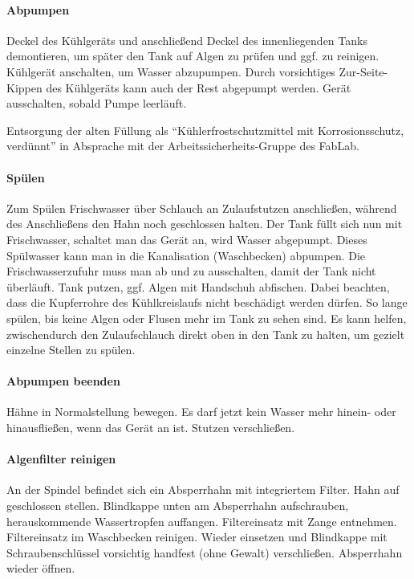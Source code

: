 \documentclass{\basedir/fablab-document}
\begin{document}
\paragraph{Abpumpen} Deckel des Kühlgeräts und anschließend Deckel des innenliegenden Tanks demontieren, um später den Tank auf Algen zu prüfen und ggf. zu reinigen. Kühlgerät anschalten, um Wasser abzupumpen. Durch vorsichtiges Zur-Seite-Kippen des Kühlgeräts kann auch der Rest abgepumpt werden. Gerät ausschalten, sobald Pumpe leerläuft.

Entsorgung der alten Füllung als \enquote{Kühlerfrostschutzmittel mit Korrosionsschutz, verdünnt} in Absprache mit der Arbeitssicherheits-Gruppe des FabLab.

\paragraph{Spülen} Zum Spülen Frischwasser über Schlauch an Zulaufstutzen anschließen, während des Anschließens den Hahn noch geschlossen halten. Der Tank füllt sich nun mit Frischwasser, schaltet man das Gerät an, wird Wasser abgepumpt. Dieses Spülwasser kann man in die Kanalisation (Waschbecken) abpumpen. Die Frischwasserzufuhr muss man ab und zu ausschalten, damit der Tank nicht überläuft. Tank putzen, ggf. Algen mit Handschuh abfischen. Dabei beachten, dass die Kupferrohre des Kühlkreislaufs nicht beschädigt werden dürfen. So lange spülen, bis keine Algen oder Flusen mehr im Tank zu sehen sind. Es kann helfen, zwischendurch den Zulaufschlauch direkt oben in den Tank zu halten, um gezielt einzelne Stellen zu spülen.

\paragraph{Abpumpen beenden} Hähne in Normalstellung bewegen. Es darf jetzt kein Wasser mehr hinein- oder hinausfließen, wenn das Gerät an ist. Stutzen verschließen.

\paragraph{Algenfilter reinigen} An der Spindel befindet sich ein Absperrhahn mit integriertem Filter. Hahn auf geschlossen stellen. Blindkappe unten am Absperrhahn aufschrauben, herauskommende Wassertropfen auffangen. Filtereinsatz mit Zange entnehmen. Filtereinsatz im Waschbecken reinigen. Wieder einsetzen und Blindkappe mit Schraubenschlüssel vorsichtig handfest (ohne Gewalt) verschließen. Absperrhahn wieder öffnen.
\end{document}
